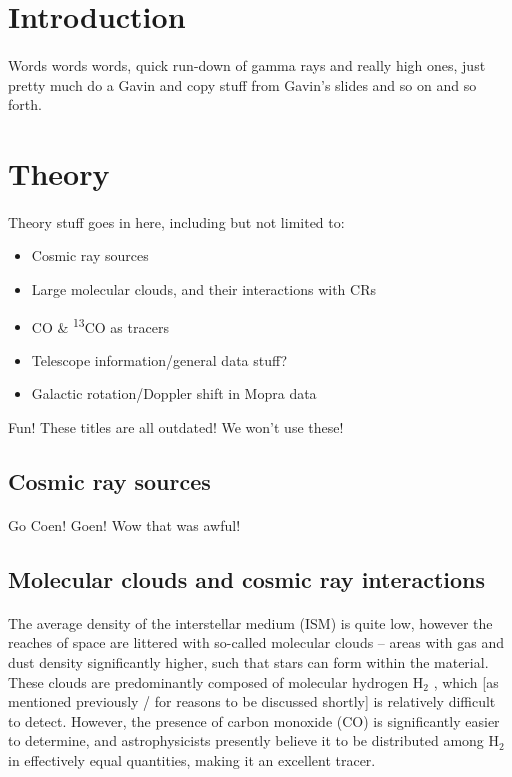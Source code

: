 \documentclass[a4paper, titlepage, oneside]{article}
\newcommand{\elem}[2]{\textsuperscript{#1}{#2}}
\newcommand{\molec}[2]{\ensuremath{\text{#1}_{#2}}}
\begin{document}
\begin{multicols}{2}
\section{Introduction}
\paragraph{}
Words words words, quick run-down of gamma rays and really high ones, just pretty much do a Gavin and copy stuff from Gavin's slides and so on and so forth.

\section{Theory}
\paragraph{}
Theory stuff goes in here, including but not limited to:
\begin{itemize}
\item Cosmic ray sources
\item Large molecular clouds, and their interactions with CRs
\item CO \& \elem{13}{CO} as tracers
\item Telescope information/general data stuff?
\item Galactic rotation/Doppler shift in Mopra data
\end{itemize}
Fun! These titles are all outdated! We won't use these!

\subsection{Cosmic ray sources}
\paragraph{}
Go Coen! Goen! Wow that was awful!

\subsection{Molecular clouds and cosmic ray interactions}
\paragraph{}
The average density of the interstellar medium (ISM) is quite low, however the reaches of space are littered with so-called molecular clouds -- areas with gas and dust density significantly higher, such that stars can form within the material. These clouds are predominantly composed of molecular hydrogen \molec{H}{2} , which [as mentioned previously / for reasons to be discussed shortly] is relatively difficult to detect. However, the presence of carbon monoxide (CO) is significantly easier to determine, and astrophysicists presently believe it to be distributed among \molec{H}{2} in effectively equal quantities, making it an excellent tracer.


\end{multicols}
\end{document}
